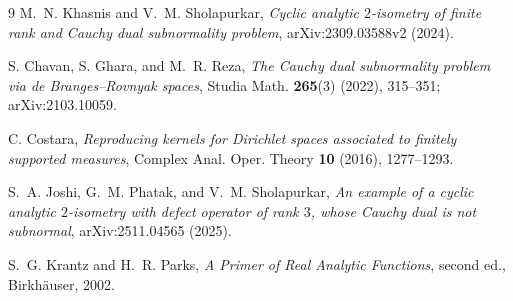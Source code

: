 \documentclass[11pt]{article}
\begin{document}
\begin{thebibliography}{9}
M.~N. Khasnis and V.~M. Sholapurkar,
\emph{Cyclic analytic $2$-isometry of finite rank and Cauchy dual
subnormality problem}, arXiv:2309.03588v2 (2024).

S. Chavan, S. Ghara, and M.~R. Reza,
\emph{The Cauchy dual subnormality problem via de Branges--Rovnyak spaces},
Studia Math. \textbf{265}(3) (2022), 315--351; arXiv:2103.10059.

C. Costara,
\emph{Reproducing kernels for Dirichlet spaces associated to finitely
supported measures}, Complex Anal. Oper. Theory \textbf{10} (2016),
1277--1293.

S.~A. Joshi, G.~M. Phatak, and V.~M. Sholapurkar,
\emph{An example of a cyclic analytic $2$-isometry with defect operator of
rank $3$, whose Cauchy dual is not subnormal}, arXiv:2511.04565 (2025).

S.~G. Krantz and H.~R. Parks,
\emph{A Primer of Real Analytic Functions}, second ed., Birkh\"auser, 2002.
\end{thebibliography}
\end{document}
